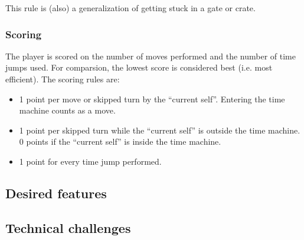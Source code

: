 This rule is (also) a generalization of getting stuck in a gate or
crate.

\subsubsection{Scoring}
The player is scored on the number of moves performed and the number
of time jumps used.  For comparsion, the lowest score is considered
best (i.e. most efficient).  The scoring rules are:

\begin{itemize}
\item 1 point per move or skipped turn by the ``current self''.
  Entering the time machine counts as a move.
\item 1 point per skipped turn while the ``current self'' is outside
  the time machine.  0 points if the ``current self'' is inside the
  time machine.
\item 1 point for every time jump performed.
\end{itemize}

\subsection{Desired features}

\subsection{Technical challenges}

